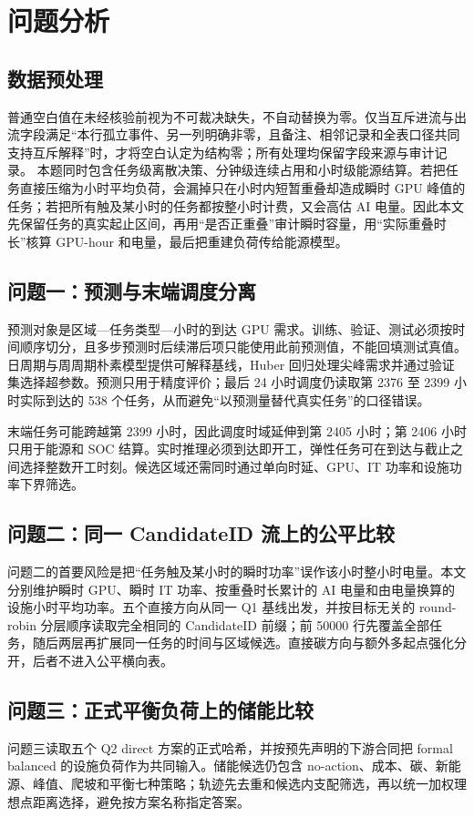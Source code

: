 \section{问题分析}

\subsection{数据预处理}
普通空白值在未经核验前视为不可裁决缺失，不自动替换为零。仅当互斥进流与出流字段满足“本行孤立事件、另一列明确非零，且备注、相邻记录和全表口径共同支持互斥解释”时，才将空白认定为结构零；所有处理均保留字段来源与审计记录。
本题同时包含任务级离散决策、分钟级连续占用和小时级能源结算。若把任务直接压缩为小时平均负荷，会漏掉只在小时内短暂重叠却造成瞬时 GPU 峰值的任务；若把所有触及某小时的任务都按整小时计费，又会高估 AI 电量。因此本文先保留任务的真实起止区间，再用“是否正重叠”审计瞬时容量，用“实际重叠时长”核算 GPU-hour 和电量，最后把重建负荷传给能源模型。

\subsection{问题一：预测与末端调度分离}
预测对象是区域—任务类型—小时的到达 GPU 需求。训练、验证、测试必须按时间顺序切分，且多步预测时后续滞后项只能使用此前预测值，不能回填测试真值。日周期与周周期朴素模型提供可解释基线，Huber 回归处理尖峰需求并通过验证集选择超参数\cite{huber1964robust}。预测只用于精度评价；最后 24 小时调度仍读取第 2376 至 2399 小时实际到达的 538 个任务，从而避免“以预测量替代真实任务”的口径错误。

末端任务可能跨越第 2399 小时，因此调度时域延伸到第 2405 小时；第 2406 小时只用于能源和 SOC 结算。实时推理必须到达即开工，弹性任务可在到达与截止之间选择整数开工时刻。候选区域还需同时通过单向时延、GPU、IT 功率和设施功率下界筛选。

\subsection{问题二：同一 CandidateID 流上的公平比较}
问题二的首要风险是把“任务触及某小时的瞬时功率”误作该小时整小时电量。本文分别维护瞬时 GPU、瞬时 IT 功率、按重叠时长累计的 AI 电量和由电量换算的设施小时平均功率。五个直接方向从同一 Q1 基线出发，并按目标无关的 round-robin 分层顺序读取完全相同的 CandidateID 前缀；前 50000 行先覆盖全部任务，随后两层再扩展同一任务的时间与区域候选。直接碳方向与额外多起点强化分开，后者不进入公平横向表。

\subsection{问题三：正式平衡负荷上的储能比较}
问题三读取五个 Q2 direct 方案的正式哈希，并按预先声明的下游合同把 formal balanced 的设施负荷作为共同输入。储能候选仍包含 no-action、成本、碳、新能源、峰值、爬坡和平衡七种策略；轨迹先去重和候选内支配筛选，再以统一加权理想点距离选择，避免按方案名称指定答案。

